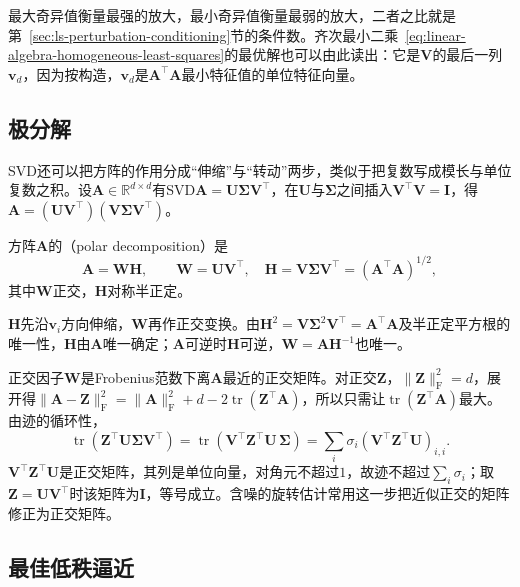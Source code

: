 最大奇异值衡量最强的放大，最小奇异值衡量最弱的放大，二者之比就是第~\ref{sec:ls-perturbation-conditioning}节的条件数。齐次最小二乘~\eqref{eq:linear-algebra-homogeneous-least-squares}的最优解也可以由此读出：它是$\bm V$的最后一列$\bm v_d$，因为按构造，$\bm v_d$是$\bm A^\top\bm A$最小特征值的单位特征向量。

\subsection{极分解}

SVD还可以把方阵的作用分成“伸缩”与“转动”两步，类似于把复数写成模长与单位复数之积。设$\bm A\in\mathbb R^{d\times d}$有SVD$\bm A=\bm U\bm\Sigma\bm V^\top$，在$\bm U$与$\bm\Sigma$之间插入$\bm V^\top\bm V=\bm I$，得$\bm A=(\bm U\bm V^\top)(\bm V\bm\Sigma\bm V^\top)$。
\begin{definition}[极分解]
\label{def:matrix-analysis-polar-decomposition}
方阵$\bm A$的（polar decomposition）是
\begin{equation}
 \bm A=\bm W\bm H,\qquad \bm W=\bm U\bm V^\top,\quad \bm H=\bm V\bm\Sigma\bm V^\top=(\bm A^\top\bm A)^{1/2},
 \label{eq:matrix-analysis-polar-decomposition}
\end{equation}
其中$\bm W$正交，$\bm H$对称半正定。
\end{definition}
$\bm H$先沿$\bm v_i$方向伸缩，$\bm W$再作正交变换。由$\bm H^2=\bm V\bm\Sigma^2\bm V^\top=\bm A^\top\bm A$及半正定平方根的唯一性，$\bm H$由$\bm A$唯一确定；$\bm A$可逆时$\bm H$可逆，$\bm W=\bm A\bm H^{-1}$也唯一。

正交因子$\bm W$是Frobenius范数下离$\bm A$最近的正交矩阵。对正交$\bm Z$，$\lVert\bm Z\rVert_{\mathrm F}^2=d$，展开得$\lVert\bm A-\bm Z\rVert_{\mathrm F}^2=\lVert\bm A\rVert_{\mathrm F}^2+d-2\operatorname{tr}(\bm Z^\top\bm A)$，所以只需让$\operatorname{tr}(\bm Z^\top\bm A)$最大。由迹的循环性，
\[
 \operatorname{tr}(\bm Z^\top\bm U\bm\Sigma\bm V^\top)=\operatorname{tr}(\bm V^\top\bm Z^\top\bm U\,\bm\Sigma)=\sum_i\sigma_i(\bm V^\top\bm Z^\top\bm U)_{i,i}.
\]
$\bm V^\top\bm Z^\top\bm U$是正交矩阵，其列是单位向量，对角元不超过$1$，故迹不超过$\sum_i\sigma_i$；取$\bm Z=\bm U\bm V^\top$时该矩阵为$\bm I$，等号成立。含噪的旋转估计常用这一步把近似正交的矩阵修正为正交矩阵。

\subsection{最佳低秩逼近}
\label{sec:ls-low-rank-solve}
\label{sec:ls-full-svd-solve}
\label{sec:matrix-analysis-svd-low-rank}

